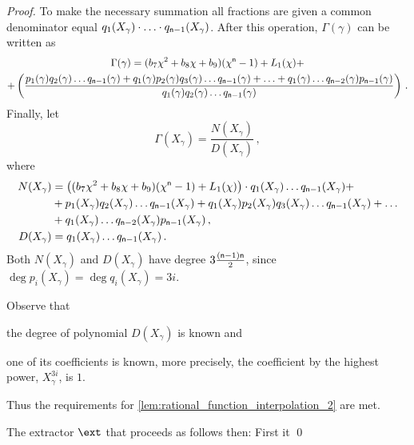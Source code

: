 \documentclass[runningheads]{llncs}
\theoremstyle{definition}
\begin{document}
\begin{proof}
To make the necessary summation all fractions are given a common denominator equal $q_1 (X_\gamma) \cdot \ldots \cdot q_{\mathsf{n} - 1} (X_\gamma)$. After this operation, $\Gamma(\gamma)$ can be written as
\begin{multline}
  \Gamma(\gamma) = (b_7 \chi^2 + b_8 \chi + b_9) (\chi^{\mathsf{n}} - 1) + L_1 (\chi) + \\
   + \left(\frac{
   p_1(\gamma) q_2(\gamma) \ldots q_{\mathsf{n} - 1}(\gamma) + q_1(\gamma) p_2(\gamma) q_3(\gamma) \ldots q_{\mathsf{n} - 1}(\gamma) + \ldots + q_1(\gamma) \ldots q_{\mathsf{n} - 2}(\gamma) p_{\mathsf{n} - 1}(\gamma)
   }{
   q_1(\gamma) q_2(\gamma) \ldots q_{\mathsf{n} - 1}(\gamma)
   }
  \right)\,.
\end{multline}
Finally, let 
\[
  \Gamma (X_\gamma) = \frac{N(X_\gamma)}{D(X_\gamma)}\,,
\]
where 
\begin{align*}
  N(X_\gamma) & = \left((b_7 \chi^2 + b_8 \chi + b_9) (\chi^{\mathsf{n}} - 1) + L_1 (\chi)\right) \cdot q_1(X_\gamma) \ldots q_{\mathsf{n} - 1}(X_\gamma) + \\
   & + p_1(X_\gamma) q_2(X_\gamma) \ldots q_{\mathsf{n} - 1}(X_\gamma) + q_1(X_\gamma) p_2(X_\gamma) q_3(X_\gamma) \ldots q_{\mathsf{n} - 1}(X_\gamma) + \ldots \\
   & + q_1(X_\gamma) \ldots q_{\mathsf{n} - 2}(X_\gamma) p_{\mathsf{n} - 1}(X_\gamma)\,,\\
  D(X_\gamma) & = q_1(X_\gamma)  \ldots q_{\mathsf{n} - 1}(X_\gamma)\,.
\end{align*} 
Both $N(X_\gamma)$ and $D(X_\gamma)$ have degree $3 \frac{(\mathsf{n} - 1) \mathsf{n}}{2}$, since $\deg p_i (X_\gamma) \allowbreak = \deg q_i (X_\gamma) = 3 i$.

Observe that 
\begin{inparaenum}[(i)]
	\item the degree of polynomial $D(X_\gamma)$ is known and 
	\item one of its coefficients is known, more precisely, the coefficient by the highest power, $X_\gamma^{3i}$, is $1$.
\end{inparaenum}
 Thus the requirements for \cref{lem:rational_function_interpolation_2} are met.
 
 The extractor $\ext$ that proceeds as follows then: First it  
\qed
\end{proof}



\end{document}
